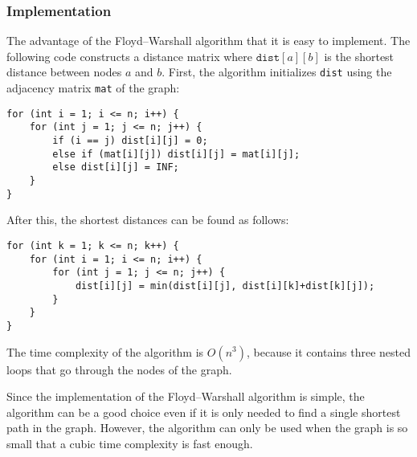 \subsubsection{Implementation}

The advantage of the
Floyd–Warshall algorithm that it is
easy to implement.
The following code constructs a
distance matrix where $\texttt{dist}[a][b]$
is the shortest distance between nodes $a$ and $b$.
First, the algorithm initializes \texttt{dist}
using the adjacency matrix \texttt{mat} of the graph:

\begin{lstlisting}
for (int i = 1; i <= n; i++) {
    for (int j = 1; j <= n; j++) {
        if (i == j) dist[i][j] = 0;
        else if (mat[i][j]) dist[i][j] = mat[i][j];
        else dist[i][j] = INF;
    }
}
\end{lstlisting}

After this, the shortest distances can be found as follows:

\begin{lstlisting}
for (int k = 1; k <= n; k++) {
    for (int i = 1; i <= n; i++) {
        for (int j = 1; j <= n; j++) {
            dist[i][j] = min(dist[i][j], dist[i][k]+dist[k][j]);
        }
    }
}
\end{lstlisting}

The time complexity of the algorithm is $O(n^3)$,
because it contains three nested loops
that go through the nodes of the graph.

Since the implementation of the Floyd–Warshall
algorithm is simple, the algorithm can be
a good choice even if it is only needed to find a
single shortest path in the graph.
However, the algorithm can only be used when the graph
is so small that a cubic time complexity is fast enough.
